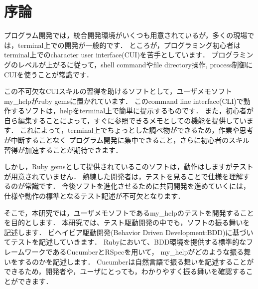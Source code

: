 \section{序論}
プログラム開発では，統合開発環境がいくつも用意されているが，多くの現場では，terminal上での開発が一般的です．
ところが，プログラミング初心者はterminal上でのcharacter user interface(CUI)を苦手としています．
プログラミングのレベルが上がるに従って，shell commandやfile directory操作, process制御にCUIを使うことが常識です．

この不可欠なCUIスキルの習得を助けるソフトとして，ユーザメモソフトmy\_helpがruby gemsに置かれています．
このcommand line interface(CLI)で動作するソフトは，helpをterminal上で簡単に提示するものです．
また，初心者が自ら編集することによって，すぐに参照できるメモとしての機能を提供しています．
これによって，terminal上でちょっとした調べ物ができるため，作業や思考が中断することなく
プログラム開発に集中できること，さらに初心者のスキル習得が加速することが期待できます．

しかし，Ruby gemsとして提供されているこのソフトは，動作はしますがテストが用意されていません．
熟練した開発者は，テストを見ることで仕様を理解するのが常識です．
今後ソフトを進化させるために共同開発を進めていくには，仕様や動作の標準となるテスト記述が不可欠となります．

そこで，本研究では，ユーザメモソフトであるmy\_helpのテストを開発することを目的とします．
本研究では、テスト駆動開発の中でも，ソフトの振る舞いを記述します．
ビヘイビア駆動開発(Behavior Driven Development:BDD)に基づいてテストを記述していきます．
Rubyにおいて、BDD環境を提供する標準的なフレームワークであるCucumberとRSpecを用いて，
my\_helpがどのような振る舞いをするのかを記述します．
Cucumberは自然言語で振る舞いを記述することができるため，開発者や，ユーザにとっても，わかりやすく振る舞いを確認することができます．

